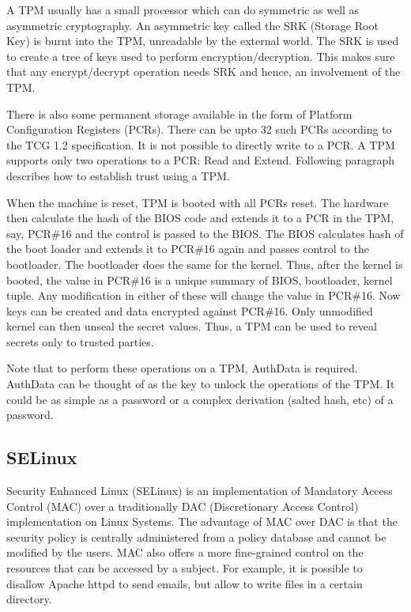\documentclass[10pt,twocolumn,pdftex]{article}
\begin{document}
A TPM usually has a small processor which can do symmetric as well as asymmetric cryptography. An asymmetric key called the SRK (Storage Root Key) is burnt into the TPM, unreadable by the external world. The SRK is used to create a tree of keys used to perform encryption/decryption. This makes sure that any encrypt/decrypt operation needs SRK and hence, an involvement of the TPM.

There is also some permanent storage available in the form of Platform Configuration Registers (PCRs). There can be upto 32 such PCRs according to the TCG 1.2 specification. It is not possible to directly write to a PCR. A TPM supports only two operations to a PCR: Read and Extend. Following paragraph describes how to establish trust using a TPM.

When the machine is reset, TPM is booted with all PCRs reset. The hardware then calculate the hash of the BIOS code and extends it to a PCR in the TPM, say, PCR\#16 and the control is passed to the BIOS. The BIOS calculates hash of the boot loader and extends it to PCR\#16 again and passes control to the bootloader. The bootloader does the same for the kernel. Thus, after the kernel is booted, the value in PCR\#16 is a unique summary of {BIOS, bootloader, kernel} tuple. Any modification in either of these will change the value in PCR\#16. Now keys can be created and data encrypted against PCR\#16. Only unmodified kernel can then unseal the secret values. Thus, a TPM can be used to reveal secrets only to trusted parties. 

Note that to perform these operations on a TPM, AuthData is required. AuthData can be thought of as the key to unlock the operations of the TPM. It could be as simple as a password or a complex derivation (salted hash, etc) of a password. 

\subsection{SELinux}
\label{sec:selinux}
Security Enhanced Linux (SELinux) \cite{SELinux} is an implementation of Mandatory Access Control (MAC) over a traditionally DAC (Discretionary Access Control) implementation on Linux Systems. The advantage of MAC over DAC is that the security policy is centrally administered from a policy database and cannot be modified by the users. MAC also offers a more fine-grained control on the resources that can be accessed by a subject. For example, it is possible to disallow Apache httpd to send emails, but allow to write files in a certain directory.
\end{document}
